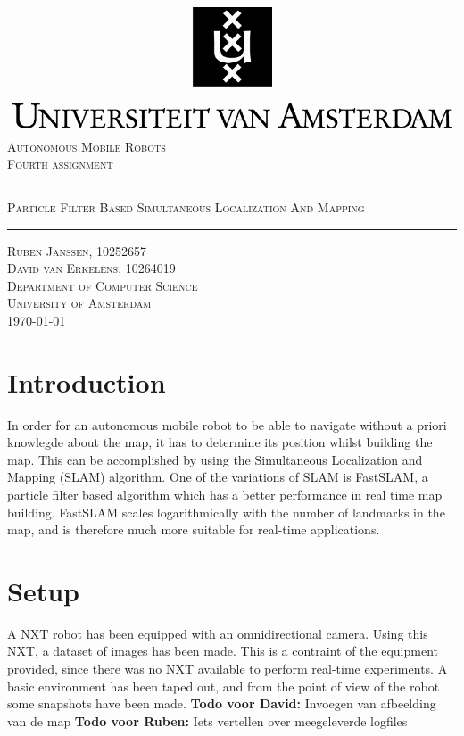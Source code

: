 \documentclass[12pt]{article}
\newcommand{\todo}[2]{{\color{red}\textbf{Todo voor #1:} #2}}
\begin{document}
\begin{titlepage}
\begin{center}
    \includegraphics[width=\textwidth]{./logo.png}
    \\ [2.5cm]
    \textsc{\Large Autonomous Mobile Robots}
    \\ [0.5cm]
    \textsc{\large Fourth assignment}
    \\ [1cm]
    \hrule
    \vspace{0.3cm}
    \textsc{Particle Filter Based Simultaneous Localization And Mapping}
    \\ [0.3cm]
    \hrule
    \vfill
    \textsc{Ruben Janssen, 10252657 \\ David van Erkelens, 10264019 \\[0.7cm] Department of Computer Science \\ University of Amsterdam \\[0.3cm] \today}
\end{center}
\end{titlepage}
\tableofcontents
\clearpage
\section{Introduction}
In order for an autonomous mobile robot to be able to navigate without a priori knowlegde about the map, it has to determine its position whilst building the map. This can be accomplished by using the Simultaneous Localization and Mapping (SLAM) algorithm. One of the variations of SLAM is FastSLAM, a particle filter based algorithm which has a better performance in real time map building. FastSLAM scales logarithmically with the number of landmarks in the map, and is therefore much more suitable for real-time applications.

\section{Setup}
A NXT robot has been equipped with an omnidirectional camera. Using this NXT, a dataset of images has been made. This is a contraint of the equipment provided, since there was no NXT available to perform real-time experiments. A basic environment has been taped out, and from the point of view of the robot some snapshots have been made. 
\todo{David}{Invoegen van afbeelding van de map}  \todo{Ruben}{Iets vertellen over meegeleverde logfiles}
\end{document}
